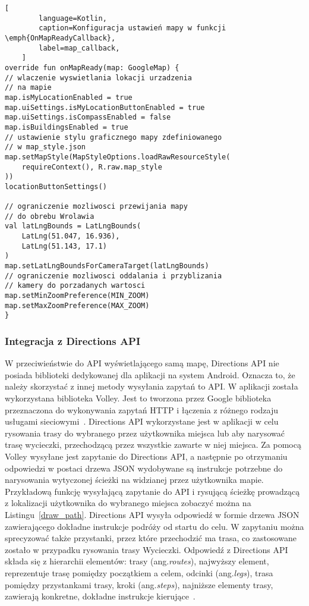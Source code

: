     \vspace{0.5cm}
    \begin{lstlisting}[
        language=Kotlin, 
        caption=Konfiguracja ustawień mapy w funkcji \emph{OnMapReadyCallback}, 
        label=map_callback,
    ]
override fun onMapReady(map: GoogleMap) {
// wlaczenie wyswietlania lokacji urzadzenia
// na mapie
map.isMyLocationEnabled = true
map.uiSettings.isMyLocationButtonEnabled = true
map.uiSettings.isCompassEnabled = false
map.isBuildingsEnabled = true
// ustawienie stylu graficznego mapy zdefiniowanego
// w map_style.json
map.setMapStyle(MapStyleOptions.loadRawResourceStyle(
    requireContext(), R.raw.map_style
))
locationButtonSettings()

// ograniczenie mozliwosci przewijania mapy
// do obrebu Wrolawia
val latLngBounds = LatLngBounds(
    LatLng(51.047, 16.936),
    LatLng(51.143, 17.1)
)
map.setLatLngBoundsForCameraTarget(latLngBounds)
// ograniczenie mozliwosci oddalania i przyblizania
// kamery do porzadanych wartosci
map.setMinZoomPreference(MIN_ZOOM)
map.setMaxZoomPreference(MAX_ZOOM)
}
    \end{lstlisting}

    \subsubsection{Integracja z Directions API}
    W przeciwieństwie do API wyświetlającego samą mapę, Directions API nie posiada biblioteki dedykowanej dla aplikacji na system Android. Oznacza to, że należy skorzystać z innej metody
    wysyłania zapytań to API. W aplikacji została wykorzystana biblioteka Volley. Jest to tworzona przez Google biblioteka przeznaczona do wykonywania zapytań HTTP i łączenia z różnego rodzaju usługami
    sieciowymi~\cite{VOLLEY}. Directions API wykorzystane jest w aplikacji w celu rysowania trasy do wybranego przez użytkownika miejsca lub aby narysować trasę wycieczki, przechodzącą przez wszystkie
    zawarte w niej miejsca. Za pomocą Volley wysyłane jest zapytanie do Directions API, a następnie po otrzymaniu odpowiedzi w postaci drzewa JSON wydobywane są instrukcje potrzebne do narysowania
    wytyczonej ścieżki na widzianej przez użytkownika mapie. Przykładową funkcję wysyłającą zapytanie do API i rysującą ścieżkę prowadzącą z lokalizacji użytkownika do wybranego miejsca zobaczyć można
    na Listingu~\ref{draw_path}. Directions API wysyła odpowiedź w formie drzewa JSON zawierającego dokładne instrukcje podróży od startu do celu. W zapytaniu można sprecyzować także przystanki,
    przez które przechodzić ma trasa, co zastosowane zostało w przypadku rysowania trasy Wycieczki. Odpowiedź z Directions API składa się z hierarchii elementów: trasy (ang.\@ \emph{routes}), najwyższy element,
    reprezentuje trasę pomiędzy początkiem a celem, odcinki (ang.\@ \emph{legs}), trasa pomiędzy przystankami trasy, kroki (ang.\@ \emph{steps}), najniższe elementy trasy, zawierają konkretne, dokładne instrukcje 
    kierujące~\cite{ROUTES}.

